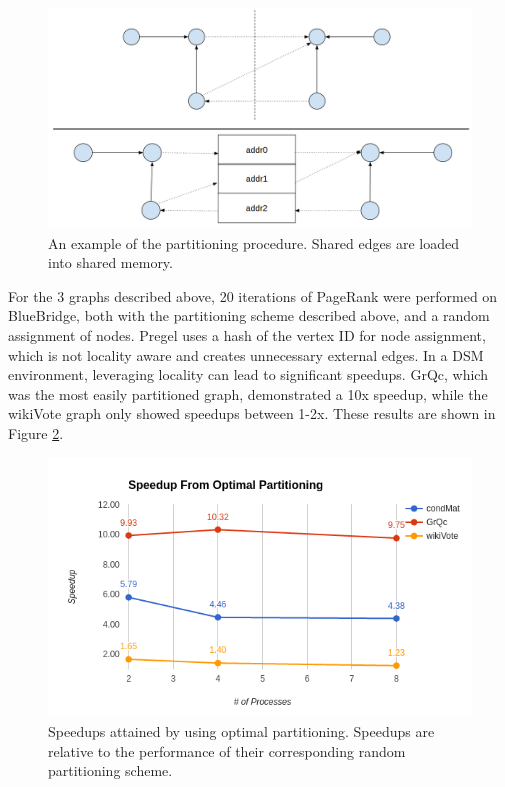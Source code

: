 \begin{figure}[h]
\includegraphics[width=\linewidth]{"fig/partition_example"}
\caption{An example of the partitioning procedure. Shared edges are loaded into
shared memory.}
\label{fig:partition}
\end{figure}

For the 3 graphs described above, 20 iterations of PageRank were performed on
BlueBridge, both with the partitioning scheme described above, and a random
assignment of nodes. Pregel uses a hash of the vertex ID for node assignment,
~\cite{Malewicz:2010:PSL:1807167.1807184} which is not locality aware and
creates unnecessary external edges. In a DSM environment, leveraging locality
can lead to significant speedups. GrQc, which was the most easily partitioned
graph, demonstrated a 10x speedup, while the wikiVote graph only showed speedups
between 1-2x. These results are shown in Figure \ref{fig:smart_rand}.

\begin{figure}[h]
\includegraphics[width=\linewidth]{"fig/smart_vs_rand"}
\caption{Speedups attained by using optimal partitioning. Speedups are relative
to the performance of their corresponding random partitioning scheme.}
\label{fig:smart_rand}
\end{figure}

